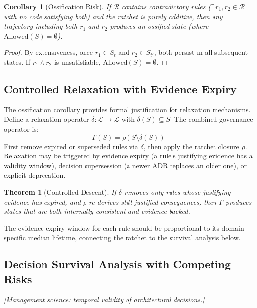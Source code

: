 \documentclass[11pt, a4paper]{googledeepmind}
\newtheorem{theorem}{Theorem}[section]
\newtheorem{corollary}{Corollary}[section]
\begin{document}
\begin{corollary}[Ossification Risk]
\label{thm:ossification}
If $\mathcal{R}$ contains contradictory rules ($\exists\, r_1, r_2 \in \mathcal{R}$ with no code satisfying both) and the ratchet is purely additive, then any trajectory including both $r_1$ and $r_2$ produces an ossified state (where $\mathrm{Allowed}(S) = \emptyset$).
\end{corollary}

\begin{proof}
By extensiveness, once $r_1 \in S_t$ and $r_2 \in S_{t'}$, both persist in all subsequent states. If $r_1 \wedge r_2$ is unsatisfiable, $\mathrm{Allowed}(S) = \emptyset$.
\end{proof}

\subsection{Controlled Relaxation with Evidence Expiry}

The ossification corollary provides formal justification for relaxation mechanisms. Define a relaxation operator $\delta: \mathcal{L} \to \mathcal{L}$ with $\delta(S) \subseteq S$. The combined governance operator is:
\begin{equation}
    \Gamma(S) = \rho(S \setminus \delta(S))
\end{equation}
First remove expired or superseded rules via $\delta$, then apply the ratchet closure $\rho$. Relaxation may be triggered by evidence expiry (a rule's justifying evidence has a validity window), decision supersession (a newer ADR replaces an older one), or explicit deprecation.

\begin{theorem}[Controlled Descent]
If $\delta$ removes only rules whose justifying evidence has expired, and $\rho$ re-derives still-justified consequences, then $\Gamma$ produces states that are both internally consistent and evidence-backed.
\end{theorem}

The evidence expiry window for each rule should be proportional to its domain-specific median lifetime, connecting the ratchet to the survival analysis below.

\subsection{Decision Survival Analysis with Competing Risks}
\emph{[Management science: temporal validity of architectural decisions.]}
\end{document}
